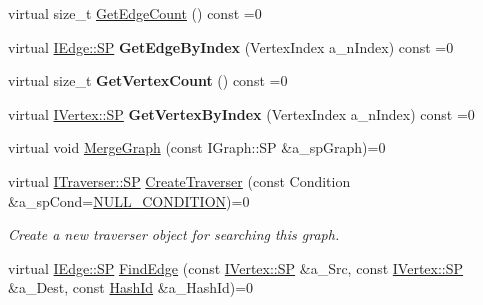 \begin{DoxyCompactItemize}
virtual size\+\_\+t \hyperlink{class_i_graph_a46918c61445d33e70de6636b81e0a829}{Get\+Edge\+Count} () const =0
\item 
\mbox{\label{class_i_graph_a473c6e003b6c1d78eed1dc2867dea290}} 
virtual \hyperlink{class_i_graph_1_1_i_edge_adfae3ec3e377543685a06b9c5d5a776a}{I\+Edge\+::\+SP} {\bfseries Get\+Edge\+By\+Index} (Vertex\+Index a\+\_\+n\+Index) const =0
\item 
\mbox{\label{class_i_graph_ac44208cb5d23934e3c94d836bc93dece}} 
virtual size\+\_\+t {\bfseries Get\+Vertex\+Count} () const =0
\item 
\mbox{\label{class_i_graph_a641a41859c784a64dafd427ccf261127}} 
virtual \hyperlink{class_i_graph_1_1_i_vertex_af72b9df91f110bc7824c608c10cc819c}{I\+Vertex\+::\+SP} {\bfseries Get\+Vertex\+By\+Index} (Vertex\+Index a\+\_\+n\+Index) const =0
\item 
virtual void \hyperlink{class_i_graph_ac18561fc46a616fde450687f557897ac}{Merge\+Graph} (const I\+Graph\+::\+SP \&a\+\_\+sp\+Graph)=0
\item 
\mbox{\label{class_i_graph_ad720ccf4b2c3fd510cfe7c93ec27573e}} 
virtual \hyperlink{class_i_graph_1_1_i_traverser_a5a5ccc81423d6024742d1898a310d812}{I\+Traverser\+::\+SP} \hyperlink{class_i_graph_ad720ccf4b2c3fd510cfe7c93ec27573e}{Create\+Traverser} (const Condition \&a\+\_\+sp\+Cond=\hyperlink{class_i_graph_af5f1100a2f9d5a6f7e795bd7b2d642a4}{N\+U\+L\+L\+\_\+\+C\+O\+N\+D\+I\+T\+I\+ON})=0
\begin{DoxyCompactList}\small\item\em Create a new traverser object for searching this graph. \end{DoxyCompactList}\item 
\mbox{\label{class_i_graph_ae254e3bba3978d52ff168c804f19b908}} 
virtual \hyperlink{class_i_graph_1_1_i_edge_adfae3ec3e377543685a06b9c5d5a776a}{I\+Edge\+::\+SP} \hyperlink{class_i_graph_ae254e3bba3978d52ff168c804f19b908}{Find\+Edge} (const \hyperlink{class_i_graph_1_1_i_vertex_af72b9df91f110bc7824c608c10cc819c}{I\+Vertex\+::\+SP} \&a\+\_\+\+Src, const \hyperlink{class_i_graph_1_1_i_vertex_af72b9df91f110bc7824c608c10cc819c}{I\+Vertex\+::\+SP} \&a\+\_\+\+Dest, const \hyperlink{class_i_graph_a27d53eee7b0a7abc9fce6c28983d5446}{Hash\+Id} \&a\+\_\+\+Hash\+Id)=0

\end{DoxyCompactItemize}
